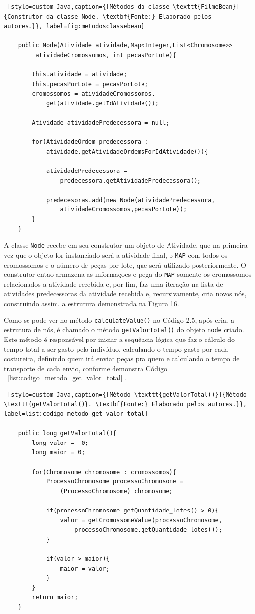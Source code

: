 \begin{lstlisting} [style=custom_Java,caption={[Métodos da classe \texttt{FilmeBean}]{Construtor da classe Node. \textbf{Fonte:} Elaborado pelos autores.}}, label=fig:metodosclassebean] 	

	public Node(Atividade atividade,Map<Integer,List<Chromosome>>
		 atividadeCromossomos, int pecasPorLote){
		
		this.atividade = atividade;
		this.pecasPorLote = pecasPorLote;
		cromossomos = atividadeCromossomos.
			get(atividade.getIdAtividade());
			
		Atividade atividadePredecessora = null;
		
		for(AtividadeOrdem predecessora : 
			atividade.getAtividadeOrdemsForIdAtividade()){
			
			atividadePredecessora = 
				predecessora.getAtividadePredecessora();
		
			predecesoras.add(new Node(atividadePredecessora,
				atividadeCromossomos,pecasPorLote));
		}
	}
\end{lstlisting}

\par A classe \texttt{Node} recebe em seu construtor um objeto de Atividade, que na primeira vez que o objeto for instanciado
será a atividade final, o \texttt{MAP} com todos os cromossomos e o número de peças por lote, que será utilizado posteriormente.
O construtor então armazena as informações e pega do \texttt{MAP} somente os cromossomos relacionados a atividade recebida e, 
por fim, faz uma iteração na lista de atividades predecessoras da atividade recebida e, recursivamente, cria novos nós, 
construindo assim, a estrutura demonstrada na Figura 16.

\par Como se pode ver no método \texttt{calculateValue()} no Código 2.5, após
criar a estrutura de nós, é chamado o método \texttt{getValorTotal()} do objeto
\texttt{node} criado. Este método é responsável por iniciar a sequência lógica que 
faz o cálculo do tempo total a ser gasto pelo indivíduo, calculando o tempo gasto por 
cada costureira, definindo quem irá enviar peças pra quem e calculando o tempo de transporte 
de cada envio, conforme demonstra Código ~\ref{list:codigo_metodo_get_valor_total} .

\begin{lstlisting} [style=custom_Java,caption={[Método \texttt{getValorTotal()}]{Método \texttt{getValorTotal()}. \textbf{Fonte:} Elaborado pelos autores.}}, label=list:codigo_metodo_get_valor_total] 	

	public long getValorTotal(){
		long valor =  0;
		long maior = 0;
		
		for(Chromosome chromosome : cromossomos){
			ProcessoChromosome processoChromosome = 
				(ProcessoChromosome) chromosome;
		
			if(processoChromosome.getQuantidade_lotes() > 0){
				valor = getCromossomeValue(processoChromosome,
					processoChromosome.getQuantidade_lotes());
			}
	
			if(valor > maior){
				maior = valor;
			}
		}
		return maior;
	}

\end{lstlisting}


